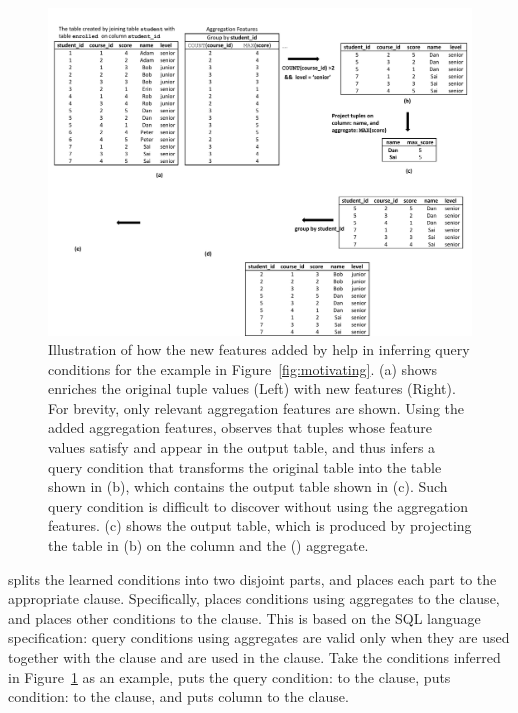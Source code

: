 

\begin{figure}[t]
  \centering
  \includegraphics[scale=0.65]{fullexample}
  \vspace*{-2.0ex}\caption {{\label{fig:fullexample}
  Illustration of how the new features added by \ourtool
  help in inferring query conditions for the example in Figure~\ref{fig:motivating}.
  (a) shows \ourtool
  enriches the original tuple values (Left)
  with new features (Right). For brevity, only relevant
  aggregation features are shown. Using the added aggregation
  features, \ourtool observes that tuples whose feature values satisfy
   and 
  appear in the output table,
  and thus infers a query condition that
  transforms the original table into the table shown in (b),
  which contains the output table shown in (c).
  Such query condition is difficult to discover 
  without using the aggregation features.
  (c) shows the output table, which is produced by projecting the
   table in (b) on the  column and the
  () aggregate.}}
  \vspace{-1mm}
\end{figure}


\ourtool splits the learned conditions into two disjoint parts,
and places each part to the appropriate clause.
Specifically, \ourtool places conditions
using aggregates to the 
clause, and places other conditions to the  clause.
This is based on the SQL language specification:
query conditions using aggregates are valid only when they
are used {together with} the  clause
and are used in the  clause.
Take the conditions inferred in Figure~\ref{fig:fullexample}
as an example, \ourtool puts the query
condition: 
to the  clause,
puts condition: 
to the  clause, and puts 
column  to the  clause.




